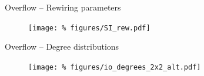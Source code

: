 \begin{frame}{Overflow -- Rewiring parameters}
  
  \begin{figure}
    \centering
    \texttt{[image: \%
    figures/SI\_rew.pdf]} %
  \end{figure}
  
\end{frame}


\begin{frame}{Overflow -- Degree distributions}

  \begin{figure}
    \centering
    \texttt{[image: \%
    figures/io\_degrees\_2x2\_alt.pdf]} %
  \end{figure}
  
  
\end{frame}
